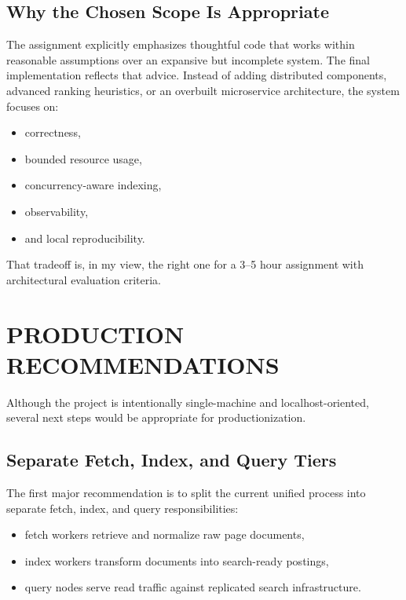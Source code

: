 \documentclass[pdftex,12pt,a4paper]{article}
\begin{document}
\subsection{Why the Chosen Scope Is Appropriate}

The assignment explicitly emphasizes thoughtful code that works within reasonable assumptions over an expansive but incomplete system. The final implementation reflects that advice. Instead of adding distributed components, advanced ranking heuristics, or an overbuilt microservice architecture, the system focuses on:

\begin{itemize}
    \item correctness,
    \item bounded resource usage,
    \item concurrency-aware indexing,
    \item observability,
    \item and local reproducibility.
\end{itemize}

That tradeoff is, in my view, the right one for a 3--5 hour assignment with architectural evaluation criteria.

\section{PRODUCTION RECOMMENDATIONS}
\label{sec:production_recommendations}

Although the project is intentionally single-machine and localhost-oriented, several next steps would be appropriate for productionization.

\subsection{Separate Fetch, Index, and Query Tiers}

The first major recommendation is to split the current unified process into separate fetch, index, and query responsibilities:

\begin{itemize}
    \item fetch workers retrieve and normalize raw page documents,
    \item index workers transform documents into search-ready postings,
    \item query nodes serve read traffic against replicated search infrastructure.
\end{itemize}
\end{document}
